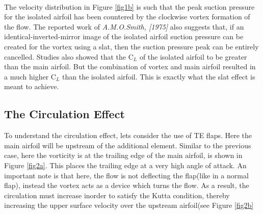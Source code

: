 \documentclass[main.tex]{subfiles}
\begin{document}
\\ The velocity distribution in Figure \ref{fig1b} is such that the peak suction pressure for the isolated airfoil has been countered by the clockwise vortex formation of the flow. The reported work of \textit{A.M.O.Smith, [1975]}\cite{highliftaero} also suggests that, if an identical-inverted-mirror image of the isolated airfoil suction pressure can be created for the vortex using a slat, then the suction pressure peak can be entirely cancelled. Studies also showed that the C$_L$ of the isolated airfoil to be greater than the main airfoil. But the combination of vortex and main airfoil resulted in a much higher C$_L$ than the isolated airfoil. This is exactly what the slat effect is meant to achieve.
\subsection{The Circulation Effect}
To understand the circulation effect, lets consider the use of TE flaps. Here the main airfoil will be upstream of the additional element. Similar to the previous case, here the vorticity is at the trailing edge of the main airfoil, is shown in Figure \ref{fig2a}. This places the trailing edge at a very high angle of attack. An important note is that here, the flow is not deflecting the flap(like in a normal flap), instead the vortex acts as a device which turns the flow. As a result, the circulation must increase inorder to satisfy the Kutta condition, thereby increasing the upper surface velocity over the upstream airfoil(see Figure \ref{fig2b}
\end{document}
